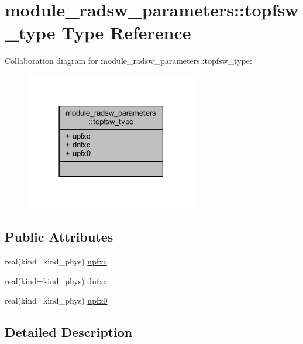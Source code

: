 \hypertarget{structmodule__radsw__parameters_1_1topfsw__type}{}\section{module\+\_\+radsw\+\_\+parameters\+:\+:topfsw\+\_\+type Type Reference}
\label{structmodule__radsw__parameters_1_1topfsw__type}


Collaboration diagram for module\+\_\+radsw\+\_\+parameters\+:\+:topfsw\+\_\+type\+:\nopagebreak
\begin{figure}[H]
\begin{center}
\leavevmode
\includegraphics[width=213pt]{structmodule__radsw__parameters_1_1topfsw__type__coll__graph}
\end{center}
\end{figure}
\subsection*{Public Attributes}
\begin{DoxyCompactItemize}
\item 
real(kind=kind\+\_\+phys) \hyperlink{structmodule__radsw__parameters_1_1topfsw__type_a444a7fd67ff2c22403779a5e83eef09b}{upfxc}
\item 
real(kind=kind\+\_\+phys) \hyperlink{structmodule__radsw__parameters_1_1topfsw__type_ac1466bb6a9da92a59bdef51439320f35}{dnfxc}
\item 
real(kind=kind\+\_\+phys) \hyperlink{structmodule__radsw__parameters_1_1topfsw__type_a992c82c935dcb4d6269c905fc184cf48}{upfx0}
\end{DoxyCompactItemize}


\subsection{Detailed Description}


